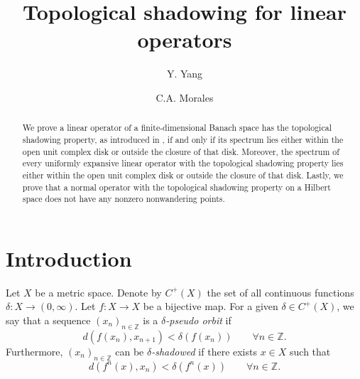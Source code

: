 \documentclass[11pt,letterpaper]{amsart}
\numberwithin{equation}{section}
\begin{document}
\title[Topological shadowing for linear operators]{Topological shadowing for linear operators}



\author{Y. Yang}

\address{School of Mathematical Sciences,
Liaoning University, Shenyang 1000191, Peoples Republic of China.}


\author[C.A. Morales]{C.A. Morales}
\address{Hangzhou International Innovation Institute of Beihang University,  
Hangzhou 311115, China.}




















\begin{abstract}
We prove a linear operator of a finite-dimensional Banach space has the topological shadowing property, as introduced in \cite{lny}, if and only if its spectrum lies either within the open unit complex disk or outside the closure of that disk.
Moreover, the spectrum of every uniformly expansive linear operator with the topological shadowing property lies either within the open unit complex disk or outside the closure of that disk.
Lastly, we prove that a normal operator with the topological shadowing property on a Hilbert space does not have any nonzero nonwandering points.
\end{abstract}




\maketitle




\section{Introduction}



\noindent
Let \( X \) be a metric space. Denote by \( C^+(X) \) the set of all continuous functions \( \delta: X \to (0, \infty) \). Let \( f: X \to X \) be a bijective map.
For a given \( \delta \in C^+(X) \), we say that a sequence \( (x_n)_{n \in \mathbb{Z}} \) is a {\em \(\delta\)-pseudo orbit} if
$$
d(f(x_n), x_{n+1}) < \delta(f(x_n))\quad\quad\forall n \in \mathbb{Z}.
$$
Furthermore, \( (x_n)_{n \in \mathbb{Z}} \) can be {\em \(\delta\)-shadowed} if there exists \( x \in X \) such that
$$
d(f^n(x), x_n) < \delta(f^n(x))
\quad\quad\forall n \in \mathbb{Z}.
$$
\end{document}

